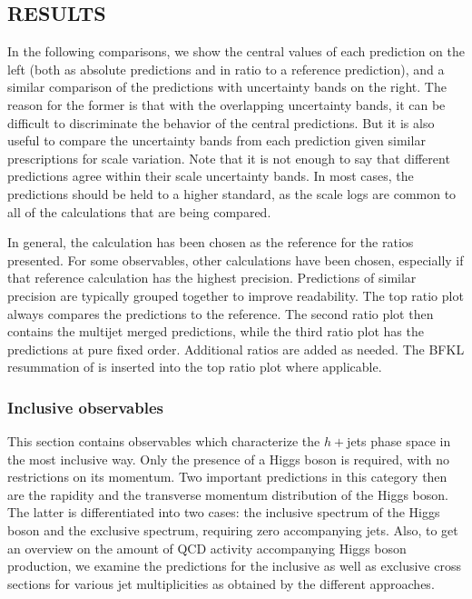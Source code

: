 \subsection{RESULTS}
\label{sec:hjetscomp:results}

In the following comparisons, we show the central
values of each prediction on the left (both as absolute predictions
and in ratio to a reference prediction), and a similar comparison of
the predictions with uncertainty bands on the right. The reason for
the former is that with the overlapping uncertainty bands, it can be
difficult to discriminate the behavior of the central predictions. But
it is also useful to compare the uncertainty bands from each
prediction given similar prescriptions for scale variation.  Note that
it is not enough to say that different predictions agree within their
scale uncertainty bands. In most cases, the predictions should be held
to a higher standard, as the scale logs are common to all of the
calculations that are being compared.

In general, the \Powheg \NNLOPS calculation has been chosen as the 
reference for the ratios presented. For some observables, other calculations
have been chosen, especially if that reference calculation has the highest
precision. Predictions of similar precision are typically grouped together 
to improve readability. The top ratio plot always compares the \NNLOPS 
predictions to the reference. 
The second ratio plot then contains the multijet merged predictions, while 
the third ratio plot has the predictions at pure fixed order. Additional ratios are added as needed. The BFKL resummation 
of \Hej is inserted into the top ratio plot where applicable.



\subsubsection{Inclusive observables}
\label{sec:hjetscomp:results:inclobs}

This section contains observables which characterize the $h+{}$jets
phase space in the most inclusive way. Only the presence of a Higgs
boson is required, with no restrictions on its momentum. Two important
predictions in this category then are  the rapidity and the transverse momentum
distribution of the Higgs boson. The latter is differentiated into
two cases: the inclusive spectrum of the Higgs boson and the exclusive spectrum, requiring
zero  accompanying jets. Also, to get an overview on the amount
of QCD activity accompanying Higgs boson production, we examine the predictions for 
the inclusive as well as exclusive cross sections for various jet
multiplicities as obtained by the different approaches.

